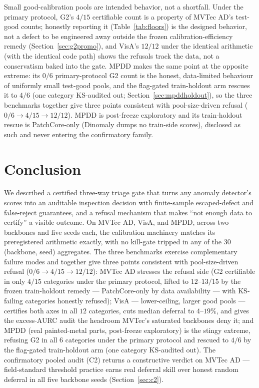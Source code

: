 \documentclass[preprint,11pt]{elsarticle}
\begin{document}
Small good-calibration pools are intended behavior, not a shortfall. Under the primary
protocol, G2's $4/15$ certifiable count is a property of MVTec AD's test-good counts; honestly
reporting it (Table~\ref{tab:floors}) is the designed behavior, not a defect to be engineered
away outside the frozen calibration-efficiency remedy (Section~\ref{sec:g2promo}), and VisA's
$12/12$ under the identical arithmetic (with the identical code path) shows the refusals track
the data, not a conservatism baked into the gate. MPDD makes the same point at the opposite
extreme: its $0/6$ primary-protocol G2 count is the honest, data-limited behaviour of uniformly
small test-good pools, and the flag-gated train-holdout arm rescues it to $4/6$ (one category
KS-audited out; Section~\ref{sec:mpddholdout}), so the three benchmarks together give three points
consistent with pool-size-driven refusal ($0/6 \to 4/15 \to 12/12$). MPDD is
post-freeze exploratory and its train-holdout rescue is PatchCore-only (Dinomaly dumps no
train-side scores), disclosed as such and never entering the confirmatory family.

\section{Conclusion}
\label{sec:conclusion}

We described a certified three-way triage gate that turns any anomaly detector's scores into an
auditable inspection decision with finite-sample escaped-defect and false-reject guarantees, and a
refusal mechanism that makes ``not enough data to certify'' a visible outcome. On MVTec AD,
VisA, and MPDD, across two backbones and five seeds each, the calibration machinery matches its
preregistered arithmetic exactly, with no kill-gate tripped in any of the $30$ (backbone, seed)
aggregates. The three benchmarks exercise complementary failure modes and together give three
points consistent with pool-size-driven refusal ($0/6 \to 4/15 \to 12/12$): MVTec AD
stresses the refusal side (G2 certifiable in only $4/15$ categories under the primary protocol,
lifted to $12$--$13/15$ by the frozen train-holdout remedy --- PatchCore-only by data availability
--- with KS-failing categories honestly refused);
VisA --- lower-ceiling, larger good pools --- certifies both axes in all $12$ categories,
cuts median deferral to $4$--$19\%$, and gives the excess-AURC audit the headroom MVTec's
saturated backbones deny it; and MPDD (real painted-metal parts, post-freeze exploratory) is the
stingy extreme, refusing G2 in all $6$ categories under the primary protocol and rescued to $4/6$
by the flag-gated train-holdout arm (one category KS-audited out). The confirmatory pooled audit
(C2) returns a constructive verdict on
MVTec AD --- field-standard threshold practice earns real deferral skill over honest random deferral
in all five backbone seeds (Section~\ref{sec:c2}).
\end{document}
